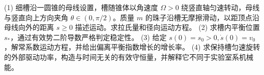 (1) 细槽沿一圆锥的母线设置，槽随锥体以角速度 \(\Omega>0\) 绕竖直轴匀速转动，母线与竖直向上方向夹角 \(\theta\in(0,\pi/2)\)。质量 \(m\) 的珠子沿槽无摩擦滑动，以距顶点沿母线向外的距离 \(s\ge0\) 描述运动。求拉氏量和径向运动方程。
(2) 求槽内平衡位置 \(s_*\)，通过有效势二阶导数严格判定稳定性。
(3) 给定 \(s(0)=s_0>0,\dot s(0)=v_0\)，解常系数运动方程，并给出偏离平衡指数增长的增长率。
(4) 求保持槽匀速旋转的外部驱动功率，构造与时间无关的有效守恒量，并解释它不同于实验室系机械能。
